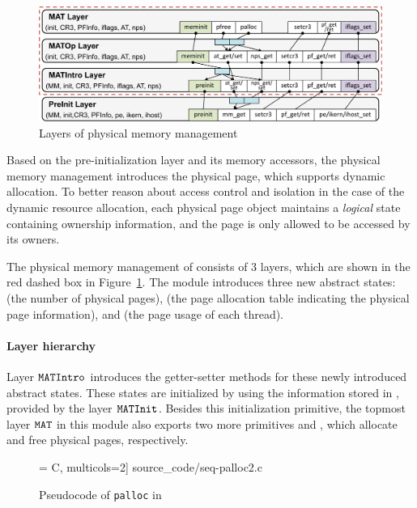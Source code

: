 {
\begin{figure}\centering
\includegraphics[scale=0.5]{figs/pmm_layer}	
\caption{Layers of physical memory management}
\label{fig:base:pmm:layers}
\hrulefill
\end{figure}
}

Based on the pre-initialization layer and its memory
accessors,
the physical memory management introduces the physical page,
which supports dynamic allocation.
To better reason about access control and isolation in the case of
the dynamic resource allocation, each physical page
object maintains a \emph{logical} state containing ownership information,
and the page is only allowed to be accessed by its owners.

The physical memory management of \mCTOSbase{}
consists of  3 layers, which are shown in the red dashed box in
Figure~\ref{fig:base:pmm:layers}.
The module introduces three new abstract states: 
 (the number
of physical pages),
 (the page allocation table
indicating the physical page information),
and  (the page usage of each thread).  

\paragraph{Layer hierarchy}
Layer ${\texttt{MATIntro}}$
introduces the getter-setter methods
for these newly introduced abstract states.
These states are initialized by  using the information
stored in , provided by the layer
${\texttt{MATInit}}$. 
Besides this initialization primitive,
the topmost layer ${\texttt{MAT}}$ in this module
also exports two more primitives
 and ,
which allocate and free physical pages,
respectively.

\begin{figure}[t]
 = C, multicols=2] {source_code/seq-palloc2.c}
\caption{Pseudocode of \texttt{palloc} in \mCTOS{}}
\label{fig:seq:palloc}
\hrulefill
\end{figure}


